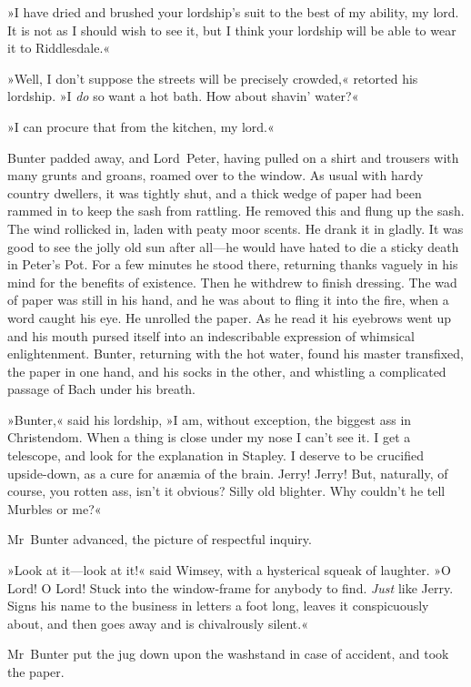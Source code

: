»I have dried and brushed your lordship's suit to the best of my ability, my lord. It is not as I should wish to see it, but I think your lordship will be able to wear it to Riddlesdale.«

»Well, I don't suppose the streets will be precisely crowded,« retorted his lordship. »I \textit{do} so want a hot bath. How about shavin' water?«

»I can procure that from the kitchen, my lord.«

Bunter padded away, and Lord~Peter, having pulled on a shirt and trousers with many grunts and groans, roamed over to the window. As usual with hardy country dwellers, it was tightly shut, and a thick wedge of paper had been rammed in to keep the sash from rattling. He removed this and flung up the sash. The wind rollicked in, laden with peaty moor scents. He drank it in gladly. It was good to see the jolly old sun after all—he would have hated to die a sticky death in Peter's Pot. For a few minutes he stood there, returning thanks vaguely in his mind for the benefits of existence. Then he withdrew to finish dressing. The wad of paper was still in his hand, and he was about to fling it into the fire, when a word caught his eye. He unrolled the paper. As he read it his eyebrows went up and his mouth pursed itself into an indescribable expression of whimsical enlightenment. Bunter, returning with the hot water, found his master transfixed, the paper in one hand, and his socks in the other, and whistling a complicated passage of Bach under his breath.

»Bunter,« said his lordship, »I am, without exception, the biggest ass in Christendom. When a thing is close under my nose I can't see it. I get a telescope, and look for the explanation in Stapley. I deserve to be crucified upside-down, as a cure for anæmia of the brain. Jerry!  Jerry! But, naturally, of course, you rotten ass, isn't it obvious?  Silly old blighter. Why couldn't he tell Murbles or me?«

Mr~Bunter advanced, the picture of respectful inquiry.

»Look at it—look at it!« said Wimsey, with a hysterical squeak of laughter. »O Lord! O Lord! Stuck into the window-frame for anybody to find. \textit{Just} like Jerry. Signs his name to the business in letters a foot long, leaves it conspicuously about, and then goes away and is chivalrously silent.«

Mr~Bunter put the jug down upon the washstand in case of accident, and took the paper.

